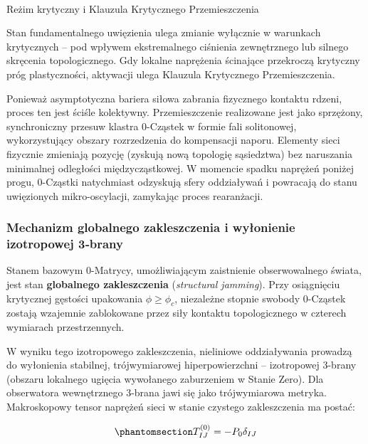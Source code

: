 \documentclass[
  polish,
  letterpaper,
  DIV=11,
  numbers=noendperiod,
  oneside]{scrartcl}
\makeatletter
\let\oldparagraph\paragraph
\renewcommand{\paragraph}{
    \@ifstar
      \xxxParagraphStar
      \xxxParagraphNoStar
  }
\newcommand{\xxxParagraphStar}[1]{\oldparagraph*{#1}\mbox{}}
\newcommand{\xxxParagraphNoStar}[1]{\oldparagraph{#1}\mbox{}}
\makeatother
\begin{document}
\paragraph{Reżim krytyczny i Klauzula Krytycznego
Przemieszczenia}\label{sec-1-2-1-3}

Stan fundamentalnego uwięzienia ulega zmianie wyłącznie w warunkach
krytycznych -- pod wpływem ekstremalnego ciśnienia zewnętrznego lub
silnego skręcenia topologicznego. Gdy lokalne naprężenia ścinające
przekroczą krytyczny próg plastyczności, aktywacji ulega Klauzula
Krytycznego Przemieszczenia.

Ponieważ asymptotyczna bariera siłowa zabrania fizycznego kontaktu
rdzeni, proces ten jest ściśle kolektywny. Przemieszczenie realizowane
jest jako sprzężony, synchroniczny przesuw klastra 0-Cząstek w formie
fali solitonowej, wykorzystujący obszary rozrzedzenia do kompensacji
naporu. Elementy sieci fizycznie zmieniają pozycję (zyskują nową
topologię sąsiedztwa) bez naruszania minimalnej odległości
międzycząstkowej. W momencie spadku naprężeń poniżej progu, 0-Cząstki
natychmiast odzyskują sfery oddziaływań i powracają do stanu uwięzionych
mikro-oscylacji, zamykając proces rearanżacji.

\subsubsection{Mechanizm globalnego zakleszczenia i wyłonienie
izotropowej 3‑brany}\label{sec-1-2-2}

Stanem bazowym 0-Matrycy, umożliwiającym zaistnienie obserwowalnego
świata, jest stan \textbf{globalnego zakleszczenia} (\emph{structural
jamming}). Przy osiągnięciu krytycznej gęstości upakowania
\(\phi \ge \phi_c\), niezależne stopnie swobody 0-Cząstek zostają
wzajemnie zablokowane przez siły kontaktu topologicznego w czterech
wymiarach przestrzennych.

W wyniku tego izotropowego zakleszczenia, nieliniowe oddziaływania
prowadzą do wyłonienia stabilnej, trójwymiarowej hiperpowierzchni --
izotropowej 3-brany (obszaru lokalnego ugięcia wywołanego zaburzeniem w
Stanie Zero). Dla obserwatora wewnętrznego 3-brana jawi się jako
trójwymiarowa metryka. Makroskopowy tensor naprężeń sieci w stanie
czystego zakleszczenia ma postać:

\begin{equation}\protect\phantomsection\label{eq-sek1-1-tens-zaklesz}{T_{IJ}^{(0)} = -P_0 \delta_{IJ}}\end{equation}
\end{document}
